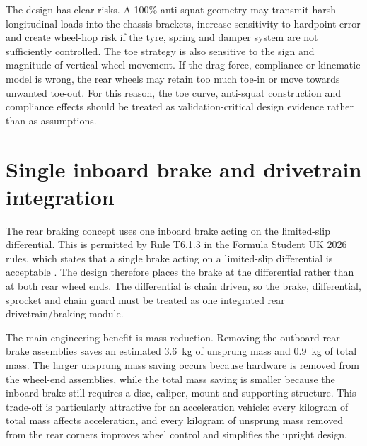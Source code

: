 The design has clear risks. A 100\% anti-squat geometry may transmit harsh longitudinal loads into the chassis brackets, increase sensitivity to hardpoint error and create wheel-hop risk if the tyre, spring and damper system are not sufficiently controlled. The toe strategy is also sensitive to the sign and magnitude of vertical wheel movement. If the drag force, compliance or kinematic model is wrong, the rear wheels may retain too much toe-in or move towards unwanted toe-out. For this reason, the toe curve, anti-squat construction and compliance effects should be treated as validation-critical design evidence rather than as assumptions.


\section{Single inboard brake and drivetrain integration}

The rear braking concept uses one inboard brake acting on the limited-slip differential. This is permitted by Rule T6.1.3 in the Formula Student UK 2026 rules, which states that a single brake acting on a limited-slip differential is acceptable \parencite{imecheFS2026Rules}. The design therefore places the brake at the differential rather than at both rear wheel ends. The differential is chain driven, so the brake, differential, sprocket and chain guard must be treated as one integrated rear drivetrain/braking module.

The main engineering benefit is mass reduction. Removing the outboard rear brake assemblies saves an estimated \SI{3.6}{kg} of unsprung mass and \SI{0.9}{kg} of total mass. The larger unsprung mass saving occurs because hardware is removed from the wheel-end assemblies, while the total mass saving is smaller because the inboard brake still requires a disc, caliper, mount and supporting structure. This trade-off is particularly attractive for an acceleration vehicle: every kilogram of total mass affects acceleration, and every kilogram of unsprung mass removed from the rear corners improves wheel control and simplifies the upright design.


